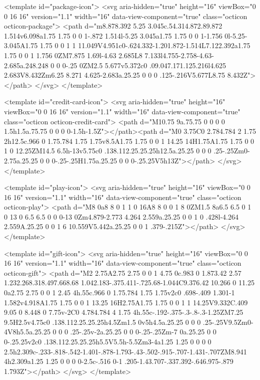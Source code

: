 <template id="package-icon">
  <svg aria-hidden="true" height="16" viewBox="0 0 16 16" version="1.1" width="16" data-view-component="true" class="octicon octicon-package">
    <path d="m8.878.392 5.25 3.045c.54.314.872.89.872 1.514v6.098a1.75 1.75 0 0 1-.872 1.514l-5.25 3.045a1.75 1.75 0 0 1-1.756 0l-5.25-3.045A1.75 1.75 0 0 1 1 11.049V4.951c0-.624.332-1.201.872-1.514L7.122.392a1.75 1.75 0 0 1 1.756 0ZM7.875 1.69l-4.63 2.685L8 7.133l4.755-2.758-4.63-2.685a.248.248 0 0 0-.25 0ZM2.5 5.677v5.372c0 .09.047.171.125.216l4.625 2.683V8.432Zm6.25 8.271 4.625-2.683a.25.25 0 0 0 .125-.216V5.677L8.75 8.432Z"></path>
</svg>
</template>

<template id="credit-card-icon">
  <svg aria-hidden="true" height="16" viewBox="0 0 16 16" version="1.1" width="16" data-view-component="true" class="octicon octicon-credit-card">
    <path d="M10.75 9a.75.75 0 0 0 0 1.5h1.5a.75.75 0 0 0 0-1.5h-1.5Z"></path><path d="M0 3.75C0 2.784.784 2 1.75 2h12.5c.966 0 1.75.784 1.75 1.75v8.5A1.75 1.75 0 0 1 14.25 14H1.75A1.75 1.75 0 0 1 0 12.25ZM14.5 6.5h-13v5.75c0 .138.112.25.25.25h12.5a.25.25 0 0 0 .25-.25Zm0-2.75a.25.25 0 0 0-.25-.25H1.75a.25.25 0 0 0-.25.25V5h13Z"></path>
</svg>
</template>

<template id="play-icon">
  <svg aria-hidden="true" height="16" viewBox="0 0 16 16" version="1.1" width="16" data-view-component="true" class="octicon octicon-play">
    <path d="M8 0a8 8 0 1 1 0 16A8 8 0 0 1 8 0ZM1.5 8a6.5 6.5 0 1 0 13 0 6.5 6.5 0 0 0-13 0Zm4.879-2.773 4.264 2.559a.25.25 0 0 1 0 .428l-4.264 2.559A.25.25 0 0 1 6 10.559V5.442a.25.25 0 0 1 .379-.215Z"></path>
</svg>
</template>

<template id="gift-icon">
  <svg aria-hidden="true" height="16" viewBox="0 0 16 16" version="1.1" width="16" data-view-component="true" class="octicon octicon-gift">
    <path d="M2 2.75A2.75 2.75 0 0 1 4.75 0c.983 0 1.873.42 2.57 1.232.268.318.497.668.68 1.042.183-.375.411-.725.68-1.044C9.376.42 10.266 0 11.25 0a2.75 2.75 0 0 1 2.45 4h.55c.966 0 1.75.784 1.75 1.75v2c0 .698-.409 1.301-1 1.582v4.918A1.75 1.75 0 0 1 13.25 16H2.75A1.75 1.75 0 0 1 1 14.25V9.332C.409 9.05 0 8.448 0 7.75v-2C0 4.784.784 4 1.75 4h.55c-.192-.375-.3-.8-.3-1.25ZM7.25 9.5H2.5v4.75c0 .138.112.25.25.25h4.5Zm1.5 0v5h4.5a.25.25 0 0 0 .25-.25V9.5Zm0-4V8h5.5a.25.25 0 0 0 .25-.25v-2a.25.25 0 0 0-.25-.25Zm-7 0a.25.25 0 0 0-.25.25v2c0 .138.112.25.25.25h5.5V5.5h-5.5Zm3-4a1.25 1.25 0 0 0 0 2.5h2.309c-.233-.818-.542-1.401-.878-1.793-.43-.502-.915-.707-1.431-.707ZM8.941 4h2.309a1.25 1.25 0 0 0 0-2.5c-.516 0-1 .205-1.43.707-.337.392-.646.975-.879 1.793Z"></path>
</svg>
</template>

